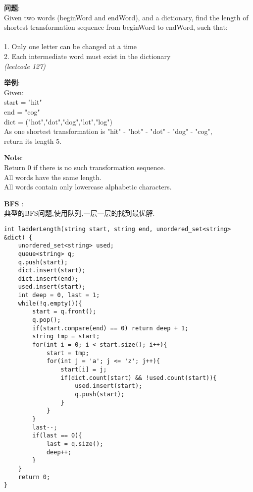     
\begin{description}
    \item{\textbf{问题}}:\\
Given two words (beginWord and endWord), and a dictionary, find the length of shortest transformation sequence from beginWord to endWord, such that:\\
\\
1.	Only one letter can be changed at a time\\
2.	Each intermediate word must exist in the dictionary\\
\textit{(leetcode 127)}
    \item{\textbf{举例}}:\\
Given:\\
start = "hit"\\
end = "cog"\\
dict = ("hot","dot","dog","lot","log")\\
As one shortest transformation is "hit" - "hot" - "dot" - "dog" - "cog",\\
return its length 5.\\
    \item{\textbf{Note}}:\\
Return 0 if there is no such transformation sequence.\\
All words have the same length.\\
All words contain only lowercase alphabetic characters.
    \item{\textbf{BFS}} : 
    \\典型的BFS问题,使用队列,一层一层的找到最优解.
    \begin{lstlisting}
int ladderLength(string start, string end, unordered_set<string> &dict) {
	unordered_set<string> used;
	queue<string> q;
	q.push(start);
	dict.insert(start);
	dict.insert(end);
	used.insert(start);
	int deep = 0, last = 1;
	while(!q.empty()){
		start = q.front();
		q.pop();
		if(start.compare(end) == 0)	return deep + 1;
		string tmp = start;
		for(int i = 0; i < start.size(); i++){
			start = tmp;
			for(int j = 'a'; j <= 'z'; j++){
				start[i] = j;
				if(dict.count(start) && !used.count(start)){
					used.insert(start);
					q.push(start);
				}
			}
		}
		last--;
		if(last == 0){
			last = q.size();
			deep++;
		}
	}
	return 0;
}
    \end{lstlisting}
\end{description}
